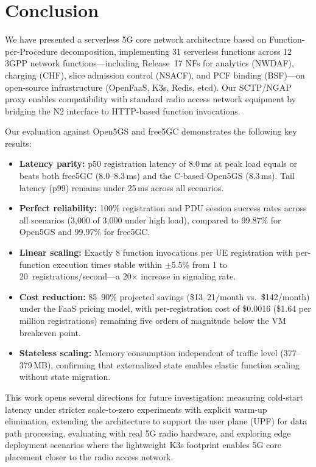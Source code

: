 \documentclass[conference]{IEEEtran}
\begin{document}
\section{Conclusion}
\label{sec:conclusion}

We have presented a serverless 5G core network architecture based on Function-per-Procedure decomposition, implementing 31 serverless functions across 12 3GPP network functions---including Release~17 NFs for analytics (NWDAF), charging (CHF), slice admission control (NSACF), and PCF binding (BSF)---on open-source infrastructure (OpenFaaS, K3s, Redis, etcd). Our SCTP/NGAP proxy enables compatibility with standard radio access network equipment by bridging the N2 interface to HTTP-based function invocations.

Our evaluation against Open5GS and free5GC demonstrates the following key results:

\begin{itemize}
\item \textbf{Latency parity:} p50 registration latency of 8.0\,ms at peak load equals or beats both free5GC (8.0--8.3\,ms) and the C-based Open5GS (8.3\,ms). Tail latency (p99) remains under 25\,ms across all scenarios.
\item \textbf{Perfect reliability:} 100\% registration and PDU session success rates across all scenarios (3{,}000 of 3{,}000 under high load), compared to 99.87\% for Open5GS and 99.97\% for free5GC.
\item \textbf{Linear scaling:} Exactly 8 function invocations per UE registration with per-function execution times stable within $\pm$5.5\% from 1 to 20~registrations/second---a 20$\times$ increase in signaling rate.
\item \textbf{Cost reduction:} 85--90\% projected savings (\$13--21/month vs.\ \$142/month) under the FaaS pricing model, with per-registration cost of \$0.0016 (\$1.64 per million registrations) remaining five orders of magnitude below the VM breakeven point.
\item \textbf{Stateless scaling:} Memory consumption independent of traffic level (377--379\,MB), confirming that externalized state enables elastic function scaling without state migration.
\end{itemize}

This work opens several directions for future investigation: measuring cold-start latency under stricter scale-to-zero experiments with explicit warm-up elimination, extending the architecture to support the user plane (UPF) for data path processing, evaluating with real 5G radio hardware, and exploring edge deployment scenarios where the lightweight K3s footprint enables 5G core placement closer to the radio access network.
\end{document}
